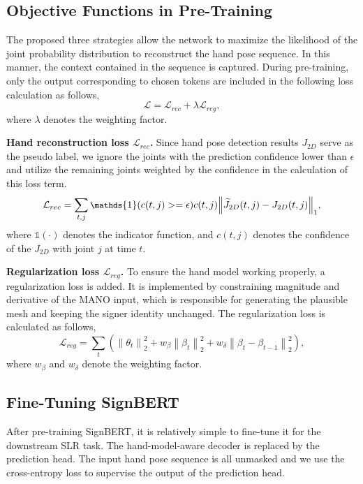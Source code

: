 \documentclass[10pt,twocolumn,letterpaper]{article}
\begin{document}
\subsection{Objective Functions in Pre-Training}
The proposed three strategies allow the network to maximize the likelihood of the joint probability distribution to reconstruct the hand pose sequence.
In this manner, the context contained in the sequence is captured.
During pre-training, only the output corresponding to chosen tokens are included in the following loss calculation as follows,
\begin{equation}
\label{equ:pre-train}
  \mathcal{L} = \mathcal{L}_{rec} + \lambda \mathcal{L}_{reg},
\end{equation}
where $\lambda$ denotes the weighting factor.

\noindent \textbf{Hand reconstruction loss $\mathcal{L}_{rec}$.}
Since hand pose detection results $J_{2D}$ serve as the pseudo label, we ignore the joints with the prediction confidence lower than $\epsilon$ and utilize the remaining joints weighted by the confidence in the calculation of this loss term.
\begin{equation}
\small
\label{equ:rec}
  \mathcal{L}_{rec} = \sum\limits_{t, j}\mathds{1}(c(t,j)>=\epsilon)c(t,j){{\left\|\widetilde{J}_{2D}(t,j) - J_{2D}(t,j) \right\|}_{1}},
\end{equation}
where $\mathds{1}(\cdot)$ denotes the indicator function, and $c(t,j)$ denotes the confidence of the ${J}_{2D}$ with joint $j$ at time $t$.

\noindent \textbf{Regularization loss $\mathcal{L}_{reg}$.}
To ensure the hand model working properly, a regularization loss is added.
It is implemented by constraining magnitude and derivative of the MANO input, which is responsible for generating the plausible mesh and keeping the signer identity unchanged.
The regularization loss is calculated as follows,
\begin{equation}
\label{equ:reg}
  \mathcal{L}_{reg} = \sum\limits_{t}( {\left\|\theta_t\right\|}_{2}^2 + w_{\beta}{\left\|\beta_t \right\|}_{2}^2 + w_{\delta}{\left\|\beta_{t} - \beta_{t-1} \right\|}_{2}^{2}),
\end{equation}
where $w_{\beta}$ and $w_{\delta}$ denote the weighting factor.


\subsection{Fine-Tuning SignBERT}
After pre-training SignBERT, it is relatively simple to fine-tune it for the downstream SLR task.
The hand-model-aware decoder is replaced by the prediction head.
The input hand pose sequence is all unmasked and we use the cross-entropy loss to supervise the output of the prediction head.
\end{document}
